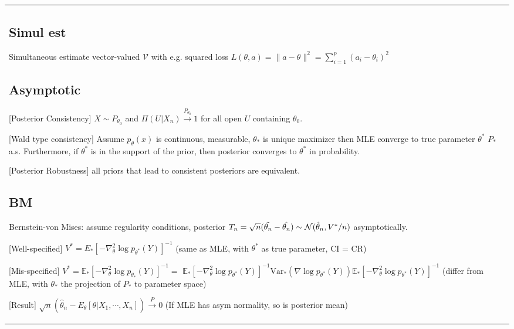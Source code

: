 \begin{tabulary}{\textwidth}{l || L}

	\subsection{Simul est}

	Simultaneous estimate vector-valued $\mathcal{V}$ with e.g. squared loss
	$L(\theta, a) = \|a - \theta\|^2 = \sum_{i=1}^{p} (a_i - \theta_i)^2$

	\subsection{Asymptotic}

	[Posterior Consistency]
	$X\sim P_{\theta_0}$ and $\Pi(U|X_n) \xrightarrow{P_{\theta_0}} 1$
	for all open $U$ containing $\theta_0$.

		[Wald type consistency]
	Assume $p_\theta(x)$ is continuous, measurable, $\theta_*$ is unique maximizer
	then MLE converge to true parameter $\theta^*$ $P_*$ a.s.
	Furthermore, if $\theta^\ast$ is in the support of the prior,
	then posterior converges to $\theta^\ast$ in probability.

		[Posterior Robustness]
	all priors that lead to consistent posteriors are equivalent.

	\subsection{BM}
	Bernstein-von Mises: assume regularity conditions, posterior
	$T_n = \sqrt{n} (\Tilde{\theta_n}-\hat{\theta_n}) \sim \mathcal{N}(\hat\theta_n, V^*/n)$
	asymptotically.

		[Well-specified]
	$V^* = E_* \left[ -\nabla_\theta^2 \log p_{\theta^*}(Y) \right]^{-1}$
	(same as MLE, with $\theta^*$ as true parameter, CI = CR)

	[Mis-specified]
	$V^* = \mathbb{E}_*\left[-\nabla_\theta^2\log p_{\theta_*}(Y)\right]^{-1}=$
	$\mathbb{E}_*\left[-\nabla_\theta^2\log p_{\theta^*}(Y)\right]^{-1}\text{Var}_*\left(\nabla\log
		p_{\theta^*}(Y)\right)\mathbb{E}_*\left[-\nabla_\theta^2\log p_{\theta^*}(Y)\right]^{-1}$
	(differ from MLE, with $\theta_*$ the projection of $P_*$ to parameter
	space)

	[Result]
	$\sqrt{n} \left( \hat\theta_n - E_\theta[\theta | X_1, \cdots, X_n] \right)
		\xrightarrow{P} 0$ (If MLE has asym normality, so is posterior mean)

\end{tabulary}
